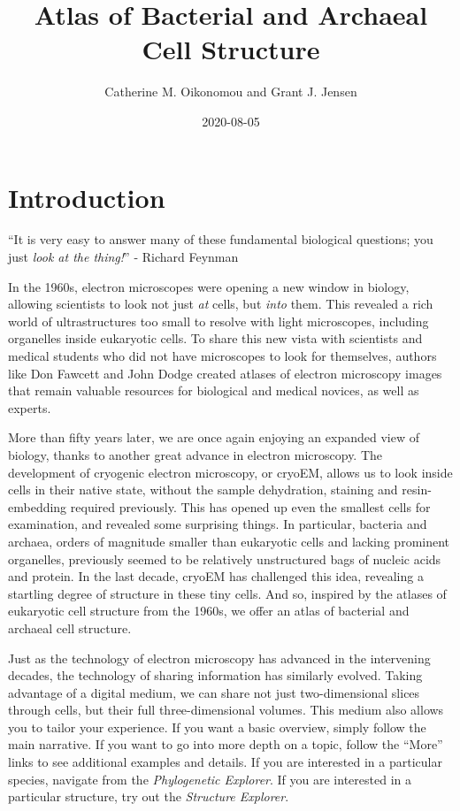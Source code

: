 \documentclass[]{tufte-book}
\title{Atlas of Bacterial and Archaeal Cell Structure}
\author{Catherine M. Oikonomou and Grant J. Jensen}
\date{2020-08-05}
\begin{document}
\maketitle



{
\setcounter{tocdepth}{1}
\tableofcontents
}

\chapter*{Introduction}\label{introduction}

``It is very easy to answer many of these fundamental biological
questions; you just \emph{look at the thing!}'' - Richard Feynman
\citep{feynman1959}

In the 1960s, electron microscopes were opening a new window in biology,
allowing scientists to look not just \emph{at} cells, but \emph{into}
them. This revealed a rich world of ultrastructures too small to resolve
with light microscopes, including organelles inside eukaryotic cells. To
share this new vista with scientists and medical students who did not
have microscopes to look for themselves, authors like Don Fawcett
\citep{fawcett1966} and John Dodge \citep{dodge1968} created atlases of
electron microscopy images that remain valuable resources for biological
and medical novices, as well as experts.

More than fifty years later, we are once again enjoying an expanded view
of biology, thanks to another great advance in electron microscopy. The
development of cryogenic electron microscopy, or cryoEM, allows us to
look inside cells in their native state, without the sample dehydration,
staining and resin-embedding required previously. This has opened up
even the smallest cells for examination, and revealed some surprising
things. In particular, bacteria and archaea, orders of magnitude smaller
than eukaryotic cells and lacking prominent organelles, previously
seemed to be relatively unstructured bags of nucleic acids and protein.
In the last decade, cryoEM has challenged this idea, revealing a
startling degree of structure in these tiny cells. And so, inspired by
the atlases of eukaryotic cell structure from the 1960s, we offer an
atlas of bacterial and archaeal cell structure.

Just as the technology of electron microscopy has advanced in the
intervening decades, the technology of sharing information has similarly
evolved. Taking advantage of a digital medium, we can share not just
two-dimensional slices through cells, but their full three-dimensional
volumes. This medium also allows you to tailor your experience. If you
want a basic overview, simply follow the main narrative. If you want to
go into more depth on a topic, follow the ``More'' links to see
additional examples and details. If you are interested in a particular
species, navigate from the \emph{Phylogenetic Explorer}. If you are
interested in a particular structure, try out the \emph{Structure
Explorer}.
\end{document}
